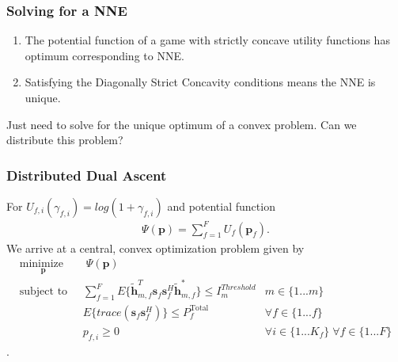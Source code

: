 \documentclass[10pt,tgadventor, onlymath]{beamer}
\begin{document}
\begin{frame}
\frametitle{Solving for a NNE}
\begin{enumerate}
\setlength\itemsep{2em}

\item
	The potential function of a game with strictly concave utility functions has optimum corresponding to NNE.
\item
	Satisfying the Diagonally Strict Concavity conditions means the NNE is unique.
\end{enumerate}
\bigskip
Just need to solve for the unique optimum of a convex problem. Can we distribute this problem?
\end{frame}

\begin{frame}
\frametitle{Distributed Dual Ascent}
For $U_{f,i}(\gamma_{f,i}) = log(1+\gamma_{f,i})$ and potential function
\begin{gather*} \label{Potential_Function}
\Psi(\mathbf{p}) = \sum_{f = 1}^{F} U_{f}(\mathbf{p}_{f}).
\end{gather*}
We arrive at a central, convex optimization problem given by
		\begin{subequations}
	\label{optim}
	\begin{align}
	    \underset{\mathbf{p}}{\text{minimize  }}
	    & \; \Psi(\mathbf{p}) \label{potential_game} \\
	    \text{subject to  } \; &
	  \sum^F_{f=1} E\{\tilde{\mathbf{h}}_{m,f}^T  \mathbf{s}_{f} 						
	\mathbf{s}_{f}^{H} \tilde{\mathbf{h}}_{m,f}^* \}\leq I^{Threshold}		
	_{m} & m \in \{1 ...m\} 
		\label{interference_const}\\
        & E\{trace(\mathbf{s}_f\mathbf{s}_f^H)\}  \leq P_{f}^{\text{Total}}  \label{power_const}
        & \forall f \in \{1 ... f\}\\
        & p_{f,i} \geq 0 &  \forall i \in \{1 ...K_{f}\} \; \forall f \in \{1 ... F\}\label{pos_power_const}
	\end{align}
	\end{subequations}.
\end{frame}
\end{document}
